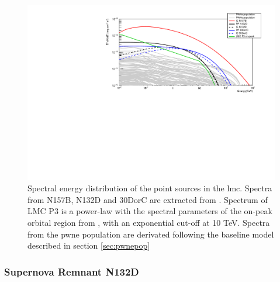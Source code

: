 \documentclass[main.tex]{subfiles}
\begin{document}
\begin{figure}
  \centering
  \includegraphics[width=\textwidth]{Pictures/pointsourcesspec.pdf}
  \caption{\label{fig:PS} Spectral energy distribution of the point sources in the \gls{lmc}. Spectra from N157B, N132D and 30DorC are extracted from \cite{2015HESSTeVLMC}. Spectrum of LMC P3 is a power-law with the spectral parameters of the on-peak orbital region from \cite{2017HESSLMCP3}, with an exponential cut-off at 10 TeV. Spectra from the \gls{pwne} population are derivated following the baseline model described in section \ref{sec:pwnepop}}
\end{figure}

\subsubsection{Supernova Remnant N132D}
\end{document}
